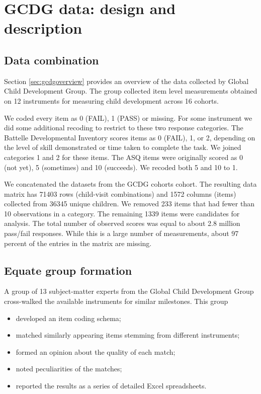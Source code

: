 \documentclass[
]{book}
\providecommand{\tightlist}{%
  \setlength{\itemsep}{0pt}\setlength{\parskip}{0pt}}
\begin{document}
\hypertarget{sec:gcdgdata}{%
\section{GCDG data: design and description}\label{sec:gcdgdata}}

\hypertarget{data-combination}{%
\subsection{Data combination}\label{data-combination}}

Section \ref{sec:gcdgoverview} provides an overview of the data collected by Global Child Development Group. The group collected item level measurements obtained on 12 instruments for measuring child development across 16 cohorts.

We coded every item as 0 (FAIL), 1 (PASS) or missing. For some instrument we did some additional recoding to restrict to these two response categories. The Battelle Developmental Inventory scores items as 0 (FAIL), 1, or 2, depending on the level of skill demonstrated or time taken to complete the task. We joined categories 1 and 2 for these items. The ASQ items were originally scored as 0 (not yet), 5 (sometimes) and 10 (succeeds). We recoded both 5 and 10 to 1.

We concatenated the datasets from the GCDG cohorts cohort. The resulting data matrix has 71403 rows (child-visit combinations) and 1572 columns (items) collected from 36345 unique children. We removed 233 items that had fewer than 10 observations in a category. The remaining 1339 items were candidates for analysis. The total number of observed scores was equal to about 2.8 million pass/fail responses. While this is a large number of measurements, about 97 percent of the entries in the matrix are missing.

\hypertarget{equate-group-formation}{%
\subsection{Equate group formation}\label{equate-group-formation}}

A group of 13 subject-matter experts from the Global Child Development Group cross-walked the available instruments for similar milestones. This group

\begin{itemize}
\tightlist
\item
  developed an item coding schema;
\item
  matched similarly appearing items stemming from different instruments;
\item
  formed an opinion about the quality of each match;
\item
  noted peculiarities of the matches;
\item
  reported the results as a series of detailed Excel spreadsheets.
\end{itemize}
\end{document}
